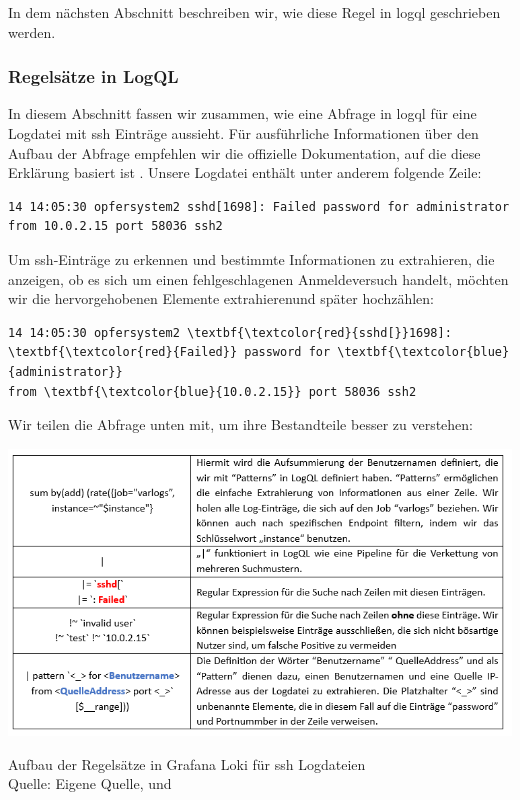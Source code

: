 In dem nächsten Abschnitt beschreiben wir, wie diese Regel in \gls{logql} geschrieben werden.

\newpage
\subsubsection{Regelsätze in LogQL}
In diesem Abschnitt fassen wir zusammen, wie eine Abfrage in \gls{logql} für eine Logdatei mit \gls{ssh} Einträge aussieht. Für ausführliche Informationen über den Aufbau der Abfrage empfehlen wir die offizielle Dokumentation, auf die diese Erklärung basiert ist \citep{Grafana_logql}. Unsere Logdatei enthält unter anderem folgende Zeile:

{
\begin{Verbatim}[frame=single]
14 14:05:30 opfersystem2 sshd[1698]: Failed password for administrator 
from 10.0.2.15 port 58036 ssh2
\end{Verbatim}
}

Um \gls{ssh}-Einträge zu erkennen und bestimmte Informationen zu extrahieren, die anzeigen, ob es sich um einen fehlgeschlagenen Anmeldeversuch handelt, möchten wir die hervorgehobenen Elemente extrahierenund später hochzählen:

{
\begin{Verbatim}[commandchars=\\\{\},frame=single]
14 14:05:30 opfersystem2 \textbf{\textcolor{red}{sshd[}}1698]: \textbf{\textcolor{red}{Failed}} password for \textbf{\textcolor{blue}{administrator}}
from \textbf{\textcolor{blue}{10.0.2.15}} port 58036 ssh2
\end{Verbatim}
}

Wir teilen die Abfrage unten mit, um ihre Bestandteile besser zu verstehen: 
\begin{table}[H]
   \includegraphics[width=1\linewidth]{assets/tabelle_logql.png}
   \caption[Aufbau der Regelsätze in Grafana Loki für \gls{ssh} Logdateien]
   {Aufbau der Regelsätze in Grafana Loki für \gls{ssh} Logdateien \\Quelle: Eigene Quelle, \citep{VoidQuark_sshlogs} und \citep{Grafana_logql}}
\end{table}

